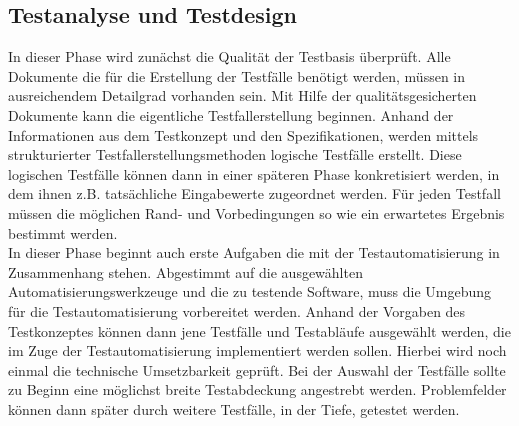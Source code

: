 \subsection{Testanalyse und Testdesign}
\label{subsec:testanalyse_und_design}
In dieser Phase wird zunächst die Qualität der Testbasis überprüft. Alle Dokumente die für die Erstellung der Testfälle benötigt werden, müssen in ausreichendem Detailgrad vorhanden sein. Mit Hilfe der qualitätsgesicherten Dokumente kann die eigentliche Testfallerstellung beginnen.
Anhand der Informationen aus dem Testkonzept und den Spezifikationen, werden mittels strukturierter Testfallerstellungsmethoden logische Testfälle erstellt. Diese logischen Testfälle können dann in einer späteren Phase konkretisiert werden, in dem ihnen z.B. tatsächliche Eingabewerte zugeordnet werden. Für jeden Testfall müssen die möglichen Rand- und Vorbedingungen so wie ein erwartetes Ergebnis bestimmt werden.\\
In dieser Phase beginnt auch erste Aufgaben die mit der Testautomatisierung in Zusammenhang stehen.
Abgestimmt auf die ausgewählten Automatisierungswerkzeuge und die zu testende Software, muss die Umgebung für die Testautomatisierung vorbereitet werden. Anhand der Vorgaben des Testkonzeptes können dann jene Testfälle und Testabläufe ausgewählt werden, die im Zuge der Testautomatisierung implementiert werden sollen. Hierbei wird noch einmal die technische Umsetzbarkeit geprüft. Bei der Auswahl der Testfälle sollte zu Beginn eine möglichst breite Testabdeckung angestrebt werden.
Problemfelder können dann später durch weitere Testfälle, in der Tiefe, getestet werden.

